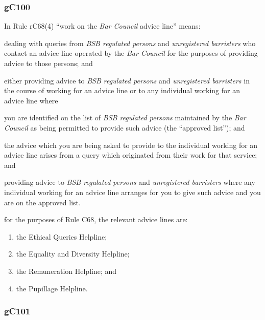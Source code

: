 \subsubsection{\color{darkgrey}gC100}

In Rule rC68(4) ``work on the \emph{Bar Council} advice line'' means:
\begin{numlist}
\item dealing with queries from \emph{BSB regulated persons} and
\emph{unregistered barristers} who contact an advice line operated by
the \emph{Bar Council} for the purposes of providing advice to those
persons; and

\item either providing advice to \emph{BSB regulated persons} and
\emph{unregistered barristers} in the course of working for an advice
line or to any individual working for an advice line where \begin{romlist}\item you are
identified on the list of \emph{BSB regulated persons} maintained by the
\emph{Bar Council} as being permitted to provide such advice (the
``approved list''); and \item the advice which you are being asked to
provide to the individual working for an advice line arises from a query
which originated from their work for that service; and\end{romlist}

\item providing advice to \emph{BSB regulated persons} and
\emph{unregistered barristers} where any individual working for an
advice line arranges for you to give such advice and you are on the
approved list.

\item for the purposes of Rule C68, the relevant advice lines are:
\begin{enumerate}[label=--]
	\item  the Ethical Queries Helpline;

\item the Equality and Diversity Helpline;

\item the Remuneration Helpline; and

\item the Pupillage Helpline.
\end{enumerate}
\end{numlist}
\subsubsection{\color{darkgrey}gC101}


